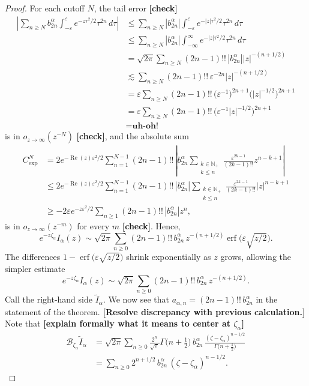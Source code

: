 \documentclass{article}
\begin{document}
\begin{proof}
\color{Purple}
For each cutoff $N$, the tail error \textbf{[check]}
\begin{align*}
\left| \sum_{n \ge N} b_{2n}^\alpha \int_{-\varepsilon}^\varepsilon e^{-z\tau^2/2} \tau^{2n}\,d\tau \right| & \le \sum_{n \ge N} \left| b_{2n}^\alpha \right| \int_{-\varepsilon}^\varepsilon e^{-|z|\tau^2/2} \tau^{2n}\,d\tau \\
& \le \sum_{n \ge N} \left| b_{2n}^\alpha \right| \int_{-\infty}^\infty e^{-|z|\tau^2/2} \tau^{2n}\,d\tau \\
& = \sqrt{2\pi} \sum_{n \ge N} (2n-1)!!\,\left| b_{2n}^\alpha \right| |z|^{-(n+1/2)} \\
& \lesssim \sum_{n \ge N} (2n-1)!!\,\varepsilon^{-2n} |z|^{-(n+1/2)} \\
& = \varepsilon \sum_{n \ge N} (2n-1)!!\,\big(\varepsilon^{-1}\big)^{2n+1} \big(|z|^{-1/2}\big)^{2n+1} \\
& = \varepsilon \sum_{n \ge N} (2n-1)!!\,\big(\varepsilon^{-1} |z|^{-1/2}\big)^{2n+1} \\
& = \textbf{uh-oh!}
\end{align*}
\color{violet}
is in $o_{z \to \infty}(z^{-N})$ \textbf{[check]}, and the absolute sum
\begin{align*}
C_\text{exp}^N & = 2e^{-\operatorname{Re}(z)\varepsilon^2/2} \sum_{n = 1}^{N-1} (2n-1)!!\,\left| b_{2n}^\alpha \sum_{\substack{k \in \mathbb{N}_+ \\ k \le n}} \frac{\varepsilon^{2k-1}}{(2k-1)!!} z^{n-k+1} \right| \\
& \le 2e^{-\operatorname{Re}(z)\varepsilon^2/2} \sum_{n = 1}^{N-1} (2n-1)!!\,\left|b_{2n}^\alpha\right| \sum_{\substack{k \in \mathbb{N}_+ \\ k \le n}} \frac{\varepsilon^{2k-1}}{(2k-1)!!} |z|^{n-k+1} \\
& \ge -2\varepsilon e^{-z\varepsilon^2/2} \sum_{n \ge 1} (2n-1)!!\,\left|b_{2n}^\alpha\right| z^n,
\end{align*}
is in $o_{z \to \infty}(z^{-m})$ for every $m$ \textbf{[check]}.\color{black} Hence,
\[ e^{-z\zeta_\alpha} I_\alpha(z) \sim \sqrt{2\pi} \sum_{n \ge 0} (2n-1)!!\,b_{2n}^\alpha\,z^{-(n+1/2)} \operatorname{erf}\big(\varepsilon \sqrt{z/2}\big). \]
The differences $1 - \operatorname{erf}\big(\varepsilon \sqrt{z/2}\big)$ shrink exponentially as $z$ grows, allowing the simpler estimate
\[ e^{-z\zeta_\alpha} I_\alpha(z) \sim \sqrt{2\pi} \sum_{n \ge 0} (2n-1)!!\,b_{2n}^\alpha\,z^{-(n+1/2)}. \]
Call the right-hand side $\tilde{I}_\alpha$. We now see that $a_{\alpha,n} = (2n-1)!!\,b_{2n}^\alpha$ in the statement of the theorem. \textbf{[Resolve discrepancy with previous calculation.]} Note that \textbf{[explain formally what it means to center at $\zeta_\alpha$]}
\begin{align*}
\mathcal{B}_{\zeta_\alpha} \tilde{I}_\alpha & = \sqrt{2\pi} \sum_{n \ge 0} \frac{2^n}{\sqrt{\pi}} \Gamma\big(n+\tfrac{1}{2}\big)\,b_{2n}^\alpha\,\frac{(\zeta - \zeta_\alpha)^{n-1/2}}{\Gamma\big(n+\tfrac{1}{2}\big)} \\
& = \sum_{n \ge 0} 2^{n+1/2}\,b_{2n}^\alpha\,(\zeta - \zeta_\alpha)^{n-1/2}.
\end{align*}


\end{proof}
\end{document}

